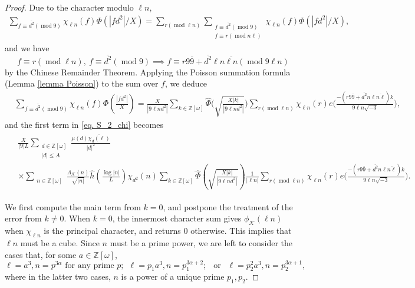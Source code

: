 \documentclass[11pt]{amsart}
\numberwithin{equation}{section}
\newcommand{\mymod}[1]{(\operatorname{mod} #1)}
\theoremstyle{remark}
\begin{document}
\begin{proof}
Due to the character modulo $\ell n$, 
\begin{align*}
    \sum_{f\equiv \overline{d^2}\mymod 9} \chi_{\ell n}(f)\Phi(|fd^2|/X)
    =
    \sum_{r\mymod{\ell n}}\sum_{\substack{f\equiv \overline{d^2}\mymod 9\\f\equiv r\mymod{n\ell}}} \chi_{\ell n}(f)\Phi(|fd^2|/X),
\end{align*}
and we have
$$f\equiv r\mymod {\ell n},  \ f\equiv \overline{d^2} \mymod 9 \implies f\equiv r9\overline{9}+\overline{d^2}\ell n\overline{\ell n}\mymod {9\ell n} $$
by the Chinese Remainder Theorem. 
Applying the Poisson summation formula (Lemma \ref{lemma Poisson}) to the sum over $f$, we deduce
\begin{align*}
    &\sum_{f\equiv \overline{d^2}\mymod 9} \chi_{\ell n}(f)\Phi\left(\frac{|fd^2|}{X}\right)
    =
    \frac{X}{|9{\ell n}d^2|}\sum_{k\in\mathbb{Z}[\omega]} \widehat{\Phi}\bigg(\sqrt{\frac{X|k|}{|9{\ell n}d^2|}}\bigg)
    \sum_{r\mymod {\ell n}} \chi_{\ell n}(r)e\bigg(\frac{-(r9\overline{9}+\overline{d^2}n\ell\overline{n\ell})k}{{9\ell n}\sqrt{-3}}\bigg),
\end{align*}
and the first term in \eqref{eq. S_2_chi} becomes
\begin{align}\label{eq. S_2_chi_PS}
   \begin{split}
    &\frac{X}{|9|L}
    \sum_{\substack{d\in \mathbb{Z}[\omega]\\ |d|\le A}}\frac{\mu(d)\overline{\chi_d(\ell)}}{|d|^2} \\
    &\times
	\sum_{\substack{n\in \mathbb{Z}[\omega]}}\frac{\Lambda_\mathcal{K}(n)}{\sqrt{|n|}}
	\hat{h}\left(\frac{\log |n|}{L}\right)
	\chi_{d^2}( n)
    \sum_{k\in\mathbb{Z}[\omega]} \widehat{\Phi}\left(\sqrt{\frac{X|k|}{|9{\ell n}d^2|}}\right)
    \frac{1}{|\ell n|}\sum_{r\mymod {\ell n}} \chi_{\ell n}(r)e\bigg(\frac{-(r9\overline{9}+\overline{d^2}n\ell\overline{n\ell})k}{{9\ell n}\sqrt{-3}}\bigg).
    \end{split}
\end{align}


We first compute the main term from $k=0$, and postpone the treatment of the error from $k\ne 0$. 
When $k=0$, the innermost character sum gives $\phi_\mathcal{K}(\ell n)$ when $\chi_{\ell n}$ is the principal character, and returns 0 otherwise. This implies that $\ell n$ must be a cube. Since $n$ must be a prime power, we are left to consider the cases that, for some $a \in\mathbb{Z}[\omega]$, 
$$\ell=a^3, n=p^{3\alpha} \text{ for any prime } p ; \ \  \ell=p_1a^3, n=p_1^{3\alpha+2}; \ \  \text{ or } \ \  \ell=p_2^2a^3, n=p_2^{3\alpha+1},$$
where in the latter two cases, $n$ is a power of a unique prime $p_1, p_2.$


\end{proof}
\end{document}

